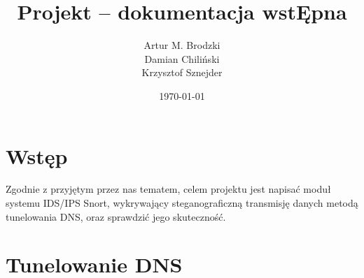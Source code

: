 \documentclass{eiti-raport}
\begin{document}
\author{Artur M. Brodzki \\ Damian Chiliński \\ Krzysztof Sznejder}
\date{\today}
\subject{BCYB 19L}
\title{Projekt -- dokumentacja wstĘpna}

\maketitle


\section{Wstęp} \label{sec:intro}
Zgodnie z przyjętym przez nas tematem, celem projektu jest napisać moduł systemu IDS/IPS Snort, wykrywający steganograficzną transmisję danych metodą tunelowania DNS, oraz sprawdzić jego skuteczność. 

\section{Tunelowanie DNS} \label{sec:2}
\end{document}
